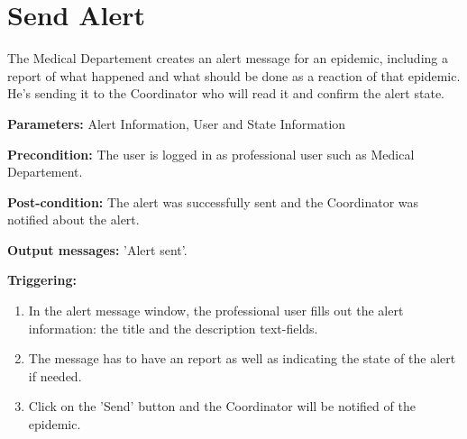 \section{Send Alert}
\label{operation:SendAlert}
The Medical Departement creates an alert message for an epidemic, including a
report of what happened and what should be done as a reaction of that epidemic.
He's sending it to the Coordinator who will read it and confirm the alert
state.\\
\begin{description}
\item \textbf{Parameters:} Alert Information, User and State Information
\item \textbf{Precondition:} The user is logged in as professional user such as
Medical Departement.
\item \textbf{Post-condition:}  The alert was successfully sent and the
Coordinator was notified about the alert.
\item \textbf{Output messages:} 'Alert sent'.
\item \textbf{Triggering:}
\begin{enumerate}
\item In the alert message window, the professional user fills out the alert
information: the title and the description text-fields.
\item The message has to have an report as well as indicating the state of the
alert if needed.
\item Click on the 'Send' button and the Coordinator will be notified of the
epidemic.
\end{enumerate}
\end{description}

